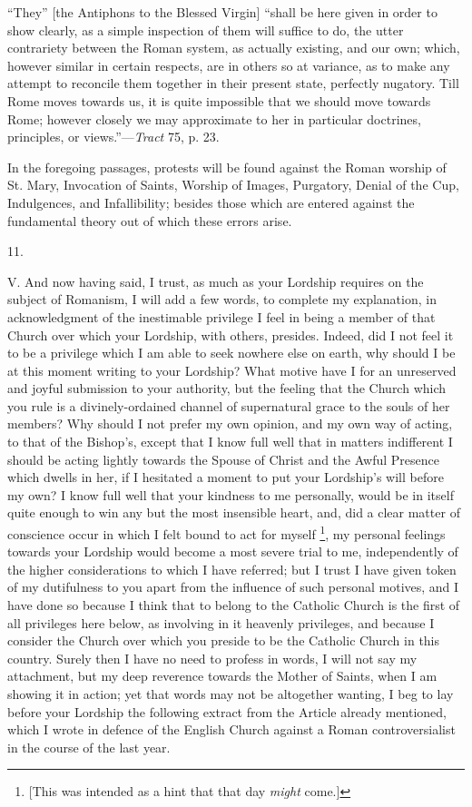 ``They''
[the Antiphons to the Blessed Virgin] ``shall be here given in order
to show clearly, as a simple inspection of them will suffice to do,
the utter contrariety between the Roman system, as actually existing,
and our own; which, however similar in certain respects, are in others
so at variance, as to make any attempt to reconcile them together in
their present state, perfectly nugatory. Till Rome moves towards us,
it is quite impossible that we should move
towards Rome; however closely we may approximate to her in particular
doctrines, principles, or views.''—\emph{Tract} 75, p. 23.

In the foregoing passages, protests will be found
against the Roman worship of St. Mary, Invocation of Saints, Worship
of Images, Purgatory, Denial of the Cup, Indulgences, and
Infallibility; besides those which are entered against the fundamental
theory out of which these errors arise.

11.

V.
And now having said, I trust, as much as your Lordship requires on the
subject of Romanism, I will add a few words, to complete my
explanation, in acknowledgment of the inestimable privilege I feel in
being a member of that Church over which your Lordship, with others,
presides. Indeed, did I not feel it to be a privilege which I am able
to seek nowhere else on earth, why should I be at this moment writing
to your Lordship? What motive have I for an unreserved and joyful
submission to your authority, but the feeling that the Church which
you rule is a divinely-ordained channel of supernatural grace to the
souls of her members? Why should I not prefer my own opinion, and my
own way of acting, to that of the Bishop's, except that I know full
well that in matters indifferent I should be acting lightly towards
the Spouse of Christ and the Awful Presence which dwells in her, if I
hesitated a moment to put your Lordship's will before my own? I know
full well that your kindness to me personally, would be in itself
quite enough to win any but the most insensible heart, and, did a
clear matter of conscience occur in which I felt bound to act for
myself \footnote{[This was intended as a hint that that day \emph{might} come.]}, my personal
feelings towards your Lordship would become a most severe trial to me,
independently of the higher considerations to which I have referred;
but I trust I have given token of my dutifulness to you apart
from the influence of such personal motives, and I have done so
because I think that to belong to the Catholic Church is the first of
all privileges here below, as involving in it heavenly privileges, and
because I consider the Church over which you preside to be the
Catholic Church in this country. Surely then I have no need to profess
in words, I will not say my attachment, but my deep reverence towards
the Mother of Saints, when I am showing it in action; yet that words
may not be altogether wanting, I beg to lay before your Lordship the
following extract from the Article already mentioned, which I wrote in
defence of the English Church against a Roman controversialist in the
course of the last year.

